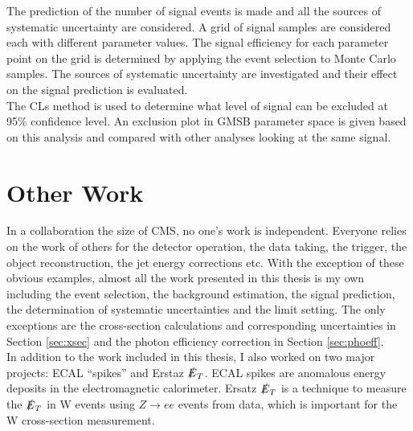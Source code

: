 The prediction of the number of signal events is made and all the sources of
systematic uncertainty are considered. A grid of signal samples are considered
each with different parameter values. The signal efficiency for each parameter
point on the grid is determined by applying the event selection to Monte Carlo 
samples. The sources of systematic uncertainty are investigated and their effect
on the signal prediction is evaluated. \\

The CLs method \cite{cls} is used to determine what level of signal can be 
excluded at 95\% confidence level. An exclusion plot in GMSB parameter space is 
given based on this analysis and compared with other analyses looking at the 
same signal.

\section{Other Work}

In a collaboration the size of CMS, no one's work is independent. Everyone
relies on the work of others for the detector operation, the data taking, the
trigger, the object reconstruction, the jet energy corrections etc. With the
exception of these obvious examples, almost all the work presented in this 
thesis is my own including the event selection, the background estimation, the
signal prediction, the determination of systematic uncertainties and the limit
setting. The only exceptions are the cross-section calculations and 
corresponding uncertainties in Section \ref{sec:xsec} and the photon efficiency
correction in Section \ref{sec:phoeff}. \\

In addition to the work included in this thesis, I also worked on two major
projects: ECAL ``spikes'' and Erstaz $\slashed{E}_{T}$. ECAL spikes are anomalous energy 
deposits in the electromagnetic calorimeter. Ersatz $\slashed{E}_{T}$ is a technique to
measure the $\slashed{E}_{T}$ in W events using $Z\rightarrow ee$ events from data, which
is important for the W cross-section measurement.

